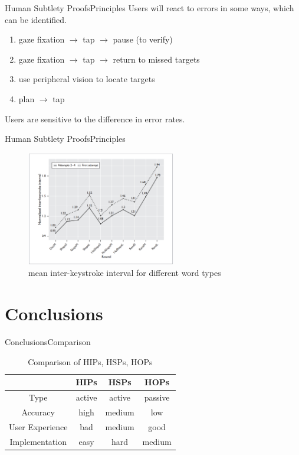 \documentclass{beamer}
\begin{document}
  \begin{frame}{Human Subtlety Proofs}{Principles}
    Users will react to errors in some ways, which can be identified.
    \begin{enumerate}
      \item gaze fixation $\rightarrow$ tap $\rightarrow$ pause (to verify)
      \item gaze fixation $\rightarrow$ tap $\rightarrow$ return to missed targets
      \item use peripheral vision to locate targets
      \item plan $\rightarrow$ tap
    \end{enumerate}
    \pause
    Users are sensitive to the difference in error rates.
  \end{frame}

  \begin{frame}{Human Subtlety Proofs}{Principles}
    \begin{figure}
        \includegraphics[width=6.5cm]{IKI.PNG}
        \caption{mean inter-keystroke interval for different word types}
    \end{figure}
  \end{frame}

  \section{Conclusions}
  \begin{frame}{Conclusions}{Comparison}
    \begin{center}
    \begin{table}
    \begin{tabular}{|c|c|c|c|}
      \hline
        & HIPs & HSPs & HOPs \\ \hline
      Type & active & active & passive \\
      Accuracy & high & medium & low \\
      User Experience & bad & medium & good    \\
      Implementation & easy & hard & medium   \\ \hline
    \end{tabular}
    \caption{Comparison of HIPs, HSPs, HOPs}
    \end{table}
    \end{center}
  \end{frame}
  
\end{document}

